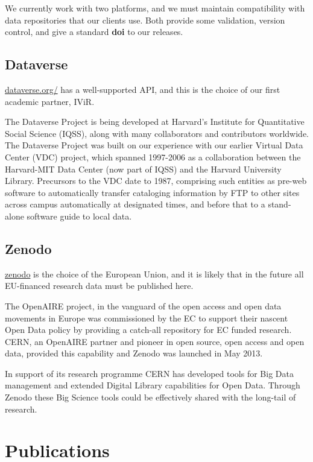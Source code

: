 \documentclass[
  fontsize=13pt,
  english,
  a4paper,
  openany, a4paper, oneside]{book}
\begin{document}
We currently work with two platforms, and we must maintain compatibility with data repositories that our clients use. Both provide some validation, version control, and give a standard \textbf{doi} to our releases.

\hypertarget{dataverse}{%
\subsection{Dataverse}\label{dataverse}}

\href{https://dataverse.org/}{dataverse.org/} has a well-supported API, and this is the choice of our first academic partner, IViR.

The Dataverse Project is being developed at Harvard's Institute for Quantitative Social Science (IQSS), along with many collaborators and contributors worldwide. The Dataverse Project was built on our experience with our earlier Virtual Data Center (VDC) project, which spanned 1997-2006 as a collaboration between the Harvard-MIT Data Center (now part of IQSS) and the Harvard University Library. Precursors to the VDC date to 1987, comprising such entities as pre-web software to automatically transfer cataloging information by FTP to other sites across campus automatically at designated times, and before that to a stand-alone software guide to local data.

\hypertarget{zenodo}{%
\subsection{Zenodo}\label{zenodo}}

\href{https://zenodo.org/}{zenodo} is the choice of the European Union, and it is likely that in the future all EU-financed research data must be published here.

The OpenAIRE project, in the vanguard of the open access and open data movements in Europe was commissioned by the EC to support their nascent Open Data policy by providing a catch-all repository for EC funded research. CERN, an OpenAIRE partner and pioneer in open source, open access and open data, provided this capability and Zenodo was launched in May 2013.

In support of its research programme CERN has developed tools for Big Data management and extended Digital Library capabilities for Open Data. Through Zenodo these Big Science tools could be effectively shared with the long-tail of research.

\hypertarget{publications}{%
\section{Publications}\label{publications}}
\end{document}
